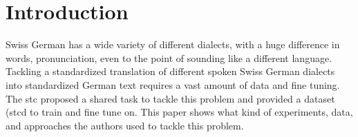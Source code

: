 \section{Introduction}
Swiss German has a wide variety of different dialects, with a huge difference in words, pronunciation, even to the point of sounding like a different language. Tackling a standardized translation of
different spoken Swiss German dialects into standardized German text requires a vast amount of data and fine tuning. The \gls{stc} proposed a shared task to tackle this problem and provided a dataset
(\gls{stcd} to train and fine tune on. This paper shows what kind of experiments, data, and approaches the authors used to tackle this problem.
